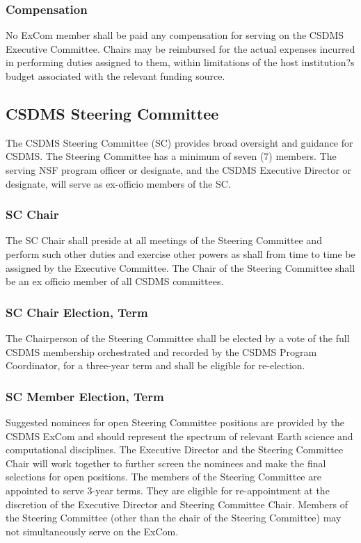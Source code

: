 \documentclass[11pt, oneside]{article}   	%
\begin{document}
\subsubsection{Compensation}
	
No ExCom member shall be paid any compensation for serving on the CSDMS Executive Committee. Chairs may be reimbursed for the actual expenses incurred in performing duties assigned to them, within limitations of the host institution?s budget associated with the relevant funding source.

\subsection{CSDMS Steering Committee}

The CSDMS Steering Committee (SC) provides broad oversight and guidance for CSDMS. The Steering Committee has a minimum of seven (7) members.  The serving NSF program officer or designate, and the CSDMS Executive Director or designate, will serve as ex-officio members of the SC.

	\subsubsection{SC Chair}
	
The SC Chair shall preside at all meetings of the Steering Committee and perform such other duties and exercise other powers as shall from time to time be assigned by the Executive Committee. The Chair of the Steering Committee shall be an ex officio member of all CSDMS committees.  
\subsubsection{SC Chair Election, Term}

The Chairperson of the Steering Committee shall be elected by a vote of the full CSDMS membership orchestrated and recorded by the CSDMS Program Coordinator, for a three-year term and shall be eligible for re-election.

\subsubsection{	SC Member Election, Term}

Suggested nominees for open Steering Committee positions are provided by the CSDMS ExCom and should represent the spectrum of relevant Earth science and computational disciplines.  The Executive Director and the Steering Committee Chair will work together to further screen the nominees and make the final selections for open positions. The members of the Steering Committee are appointed to serve 3-year terms.  They are eligible for re-appointment at the discretion of the Executive Director and Steering Committee Chair. Members of the Steering Committee (other than the chair of the Steering Committee) may not simultaneously serve on the ExCom. 
\end{document}
